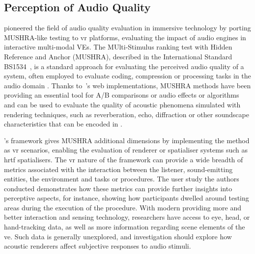 


\subsection{Perception of Audio Quality}
\cite{rummukainen2018audio} pioneered the field of audio quality evaluation in immersive technology by porting MUSHRA-like testing to \acrshort{vr} platforms, evaluating the impact of audio engines in interactive multi-modal VEs. The MUlti-Stimulus ranking test with Hidden Reference and Anchor (MUSHRA), described in the International Standard BS1534~\citep{liebetrau2014revision}, is a standard approach for evaluating the perceived audio quality of a system, often employed to evaluate coding, compression or processing tasks in the audio domain \citep{series2014method}. Thanks to~\cite{waet2015}'s web implementations, MUSHRA methods have been providing an essential tool for A/B comparisons or audio effects or algorithms and can be used to evaluate the quality of acoustic phenomena simulated with rendering techniques, such as reverberation, echo, diffraction or other soundscape characteristics that can be encoded in .\par
\cite{rummukainen2018audio}'s framework gives MUSHRA additional dimensions by implementing the method as \acrshort{vr} scenarios, enabling the evaluation of renderer or spatialiser systems such as \acrshort{hrtf} spatialisers. The \acrshort{vr} nature of the framework can provide a wide breadth of metrics associated with the interaction between the listener, sound-emitting entities, the environment and tasks or procedures. The user study the authors conducted demonstrates how these metrics can provide further insights into perceptive aspects, for instance, showing how participants dwelled around testing areas during the execution of the procedure. With modern  providing more and better interaction and sensing technology, researchers have access to eye, head, or hand-tracking data, as well as more information regarding scene elements of the \acrshort{ve}. Such data is generally unexplored, and investigation should explore how acoustic renderers affect subjective responses to audio stimuli.\par

